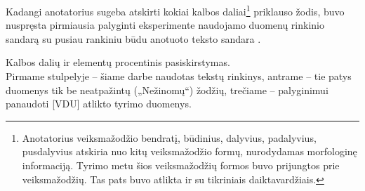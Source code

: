\documentclass{VUMIFInfBakalaurinis}
\begin{document}
Kadangi anotatorius sugeba atskirti kokiai kalbos daliai\footnote{Anotatorius
  veiksmažodžio bendratį, būdinius, dalyvius, padalyvius, pusdalyvius
  atskiria nuo kitų veiksmažodžio formų, nurodydamas morfologinę
  informaciją. Tyrimo metu šios veiksmažodžių formos buvo prijungtos
  prie veiksmažodžių. Tas pats buvo atlikta ir su tikriniais
  daiktavardžiais.} priklauso žodis, buvo nuspręsta pirmiausia palyginti
eksperimente naudojamo duomenų rinkinio sandarą su pusiau rankiniu būdu
anotuoto teksto sandara \cite{utka2009davzninis}.

\begin{table}[H]
  \centering
	\caption{Kalbos dalių ir elementų procentinis pasiskirstymas.\\ 
	Pirmame stulpelyje – šiame darbe naudotas tekstų rinkinys, 
	antrame – tie patys duomenys tik be neatpažintų („Nežinomų“) 
	žodžių, trečiame – palyginimui panaudoti [VDU] atlikto tyrimo duomenys.}


\end{table}
\end{document}
